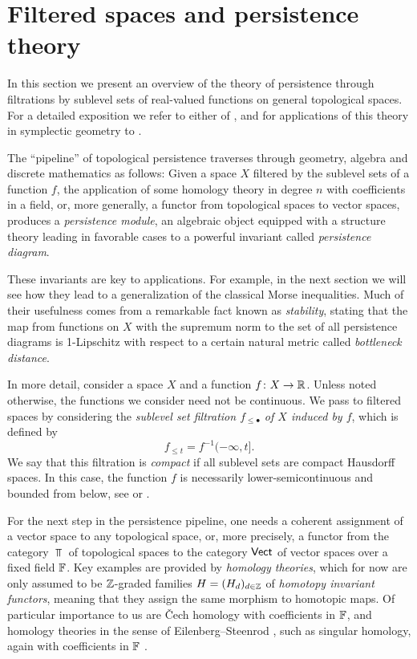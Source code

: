 
\section{Filtered spaces and persistence theory} \label{s:persistence}

In this section we present an overview of the theory of persistence through filtrations by sublevel sets of real-valued functions on general topological spaces.
For a detailed exposition we refer to either of \cite{Chazal.2016a, Oudot.2015, Polterovich.2020}, and for applications of this theory in symplectic geometry to 
\cite{Polterovich.2016, Usher.2016, LeRoux.2018, Shelukhin.2019}.

The ``pipeline'' of topological persistence traverses through geometry, algebra and discrete mathematics as follows:
Given a space $X$ filtered by the sublevel sets of a function $f$, the application of some homology theory in degree $n$ with coefficients in a field, or, more generally, a functor from topological spaces to vector spaces, produces a \emph{persistence module}, an algebraic object equipped with a structure theory leading in favorable cases to a powerful invariant called \emph{persistence diagram}.

These invariants are key to applications.
For example, in the next section we will see how they lead to a generalization of the classical Morse inequalities.
Much of their usefulness comes from a remarkable fact known as \emph{stability}, stating that the map from functions on $X$ with the supremum norm to the set of all persistence diagrams is 1-Lipschitz with respect to a certain natural metric called \emph{bottleneck distance}.

In more detail, consider a space $X$ and a function $f \colon X \to \mathbb{R}$.
Unless noted otherwise, the functions we consider need not be continuous.
We pass to filtered spaces by considering the \emph{sublevel set filtration $f_{\leq \bullet}$ of $X$ induced by $f$}, which is defined by
\begin{equation*}
f_{\leq t} = f^{-1}(-\infty, t].
\end{equation*}
We say that this filtration is \emph{compact} if all sublevel sets are compact Hausdorff spaces.
In this case, the function $f$ is necessarily lower-semicontinuous and bounded from below, see \cite[p.~444]{Morse.1939} or \cite[Theorem 3.1]{Struwe.1988}.

For the next step in the persistence pipeline, one needs a coherent assignment of a vector space to any topological space, or, more precisely, a functor from the category $\Top$ of topological spaces to the category $\mathsf{Vect}$ of vector spaces over a fixed field $\mathbb{F}$.
Key examples are provided by \emph{homology theories}, which for now are only assumed to be $\mathbb{Z}$-graded families $H = (H_d)_{d \in \mathbb{Z}}$ of \emph{homotopy invariant functors}, meaning that they assign the same morphism to homotopic maps.
Of particular importance to us are \v{C}ech homology \cite[Section IX--X]{Eilenberg.1952} with coefficients in $\mathbb{F}$, and homology theories in the sense of Eilenberg--Steenrod \cite[Section I]{Eilenberg.1952}, such as singular homology, again with coefficients in $\mathbb{F}$ \cite{Eilenberg.1944}.

